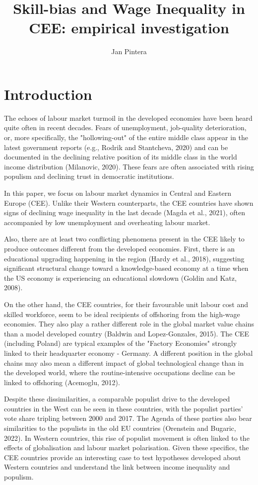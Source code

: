 \documentclass{article}
\title{Skill-bias and Wage Inequality in CEE: empirical investigation}
\author{Jan Pintera}
\date{}
\begin{document}
\maketitle
\section{Introduction}
The echoes of labour market turmoil in the developed economies have been heard quite often in recent decades. Fears of unemployment, job-quality deterioration, or, more specifically, the "hollowing-out" of the entire middle class appear in the latest government reports (e.g., Rodrik and Stantcheva, 2020) and can be documented in the declining relative position of its middle class in the world income distribution (Milanovic, 2020). These fears are often associated with rising populism and declining trust in democratic institutions.

In this paper, we focus on labour market dynamics in Central and Eastern Europe (CEE). Unlike their Western counterparts, the CEE countries have shown signs of declining wage inequality in the last decade (Magda et al., 2021), often accompanied by low unemployment and overheating labour market.

Also, there are at least two conflicting phenomena present in the CEE likely to produce outcomes different from the developed economies. First, there is an educational upgrading happening in the region (Hardy et al., 2018), suggesting significant structural change toward a knowledge-based economy at a time when the US economy is experiencing an educational slowdown (Goldin and Katz, 2008).

On the other hand, the CEE countries, for their favourable unit labour cost and skilled workforce, seem to be ideal recipients of offshoring from the high-wage economies. They also play a rather different role in the global market value chains than a model developed country (Baldwin and Lopez-Gonzales, 2015). The CEE (including Poland) are typical examples of the "Factory Economies" strongly linked to their headquarter economy - Germany. 
A different position in the global chains may also mean a different impact of global technological change than in the developed world, where the routine-intensive occupations decline can be linked to offshoring (Acemoglu, 2012).

Despite these dissimilarities, a comparable populist drive to the developed countries in the West can be seen in these countries, with the populist parties' vote share tripling between 2000 and 2017. The Agenda of these parties also bear similarities to the populists in the old EU countries (Orenstein and Bugaric, 2022). In Western countries, this rise of populist movement is often linked to the effects of globalisation and labour market polarisation. Given these specifics, the CEE countries provide an interesting case to test hypotheses developed about Western countries and understand the link between income inequality and populism. 
\end{document}
